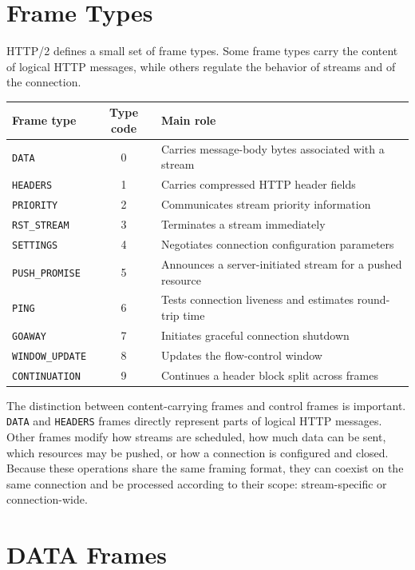 \documentclass{scrbook}
\begin{document}
\section{Frame Types}

HTTP/2 defines a small set of frame types. Some frame types carry the content of logical HTTP messages, while others regulate the behavior of streams and of the connection.

\begin{center}
	\begin{tabular}{lcl}
		\hline
		Frame type & Type code & Main role \\
		\hline
		\texttt{DATA} & 0 & Carries message-body bytes associated with a stream \\
		\texttt{HEADERS} & 1 & Carries compressed HTTP header fields \\
		\texttt{PRIORITY} & 2 & Communicates stream priority information \\
		\texttt{RST\_STREAM} & 3 & Terminates a stream immediately \\
		\texttt{SETTINGS} & 4 & Negotiates connection configuration parameters \\
		\texttt{PUSH\_PROMISE} & 5 & Announces a server-initiated stream for a pushed resource \\
		\texttt{PING} & 6 & Tests connection liveness and estimates round-trip time \\
		\texttt{GOAWAY} & 7 & Initiates graceful connection shutdown \\
		\texttt{WINDOW\_UPDATE} & 8 & Updates the flow-control window \\
		\texttt{CONTINUATION} & 9 & Continues a header block split across frames \\
		\hline
	\end{tabular}
\end{center}

The distinction between content-carrying frames and control frames is important. \texttt{DATA} and \texttt{HEADERS} frames directly represent parts of logical HTTP messages. Other frames modify how streams are scheduled, how much data can be sent, which resources may be pushed, or how a connection is configured and closed. Because these operations share the same framing format, they can coexist on the same connection and be processed according to their scope: stream-specific or connection-wide.

\section{DATA Frames}
\end{document}
